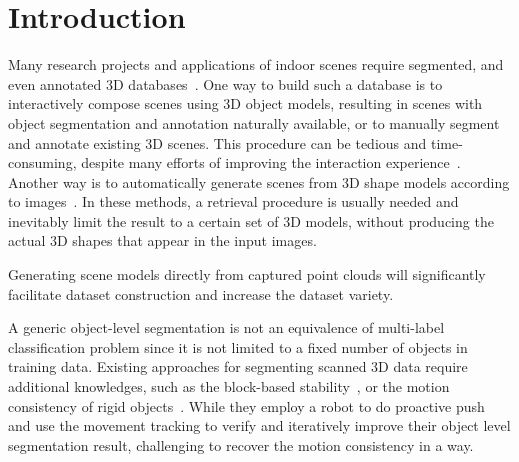 \section{Introduction}
\label{sec:intro}
% 
Many research projects and applications of indoor scenes require segmented, and even annotated 3D databases~\cite{SearchClassify,SceneFromExample,Fisher:2012:ESO:2366145.2366154,Chen:2014:ASM:2661229.2661239,Fisher:ActivityCentricSceneSynthesis}.
%
One way to build such a database is to interactively compose scenes using 3D object models, resulting in scenes with object segmentation and annotation naturally available, or to manually segment and annotate existing 3D scenes. 
%
This procedure can be tedious and time-consuming, despite many efforts of improving the interaction experience~\cite{Merrell:2011:IFL:2010324.1964982, Xu:2013:SSC:2461912.2461968}.
%
Another way is to automatically generate scenes from 3D shape models according to images~\cite{Liu2015Model,Chen:2014:ASM:2661229.2661239}. 
%
In these methods, a retrieval procedure is usually needed and inevitably limit the result to a certain set of 3D models, without producing the actual 3D shapes that appear in the input images.

%
Generating scene models directly from captured point clouds will significantly facilitate dataset construction and increase the dataset variety.
%
%


A generic object-level segmentation is not an equivalence of multi-label classification problem since it is not limited to a fixed number of objects in training data. 
%
Existing approaches for segmenting scanned 3D data require additional knowledges, such as the block-based stability~\cite{3DReasoningfromBlockstoStability}, or the motion consistency of rigid objects~\cite{Xu:2015:ACS:2816795.2818075}.  
%
%
While they employ a robot to do proactive push and use the movement tracking to verify and iteratively improve their object level segmentation result,  challenging to recover the motion consistency in a  way.

